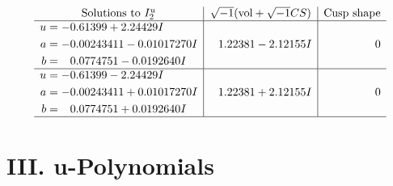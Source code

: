 \documentclass[1p]{elsarticle_modified}
\theoremstyle{definition}
\newcommand{\I}{\sqrt{-1}}
\begin{document}
$$\begin{array}{c|c|c}
\text{Solutions to }I^u_{2}& \I (\text{vol} + \sqrt{-1}CS) & \text{Cusp shape}\\
 \hline 
\begin{aligned}
u &= -0.61399 + 2.24429 I \\
a &= -0.00243411 - 0.01017270 I \\
b &= \phantom{-}0.0774751 - 0.0192640 I\end{aligned}
 & \phantom{-}1.22381 - 2.12155 I & \phantom{-0.000000 } 0 \\ \hline\begin{aligned}
u &= -0.61399 - 2.24429 I \\
a &= -0.00243411 + 0.01017270 I \\
b &= \phantom{-}0.0774751 + 0.0192640 I\end{aligned}
 & \phantom{-}1.22381 + 2.12155 I & \phantom{-0.000000 } 0\\
 \hline 
 \end{array}$$\newpage
\newpage\renewcommand{\arraystretch}{1}
\centering \section*{ III. u-Polynomials}
\end{document}
